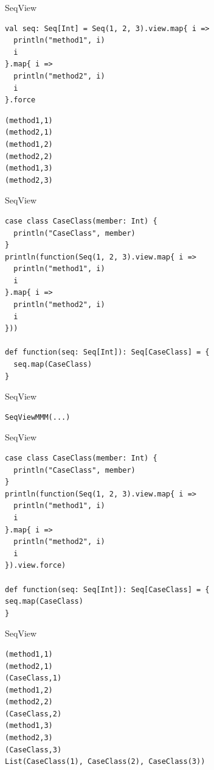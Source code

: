 \documentclass[xcolor=svgnames]{beamer}
\begin{document}
    \begin{frame}[fragile] %
    {SeqView}
        \begin{Verbatim}[formatcom=\sffamily]
val seq: Seq[Int] = Seq(1, 2, 3).view.map{ i =>
  println("method1", i)
  i
}.map{ i =>
  println("method2", i)
  i
}.force
        \end{Verbatim}

        \noindent\makebox[\linewidth]{\rule{\paperwidth}{0.4pt}}

        \pause

        \begin{Verbatim}[formatcom=\sffamily]
(method1,1)
(method2,1)
(method1,2)
(method2,2)
(method1,3)
(method2,3)
        \end{Verbatim}
    \end{frame}

    \begin{frame}[fragile] %
    {SeqView}
        \begin{Verbatim}[formatcom=\sffamily]
case class CaseClass(member: Int) {
  println("CaseClass", member)
}
println(function(Seq(1, 2, 3).view.map{ i =>
  println("method1", i)
  i
}.map{ i =>
  println("method2", i)
  i
}))

def function(seq: Seq[Int]): Seq[CaseClass] = {
  seq.map(CaseClass)
}
        \end{Verbatim}
    \end{frame}

    \begin{frame}[fragile] %
    {SeqView}
        \begin{Verbatim}[formatcom=\sffamily]
SeqViewMMM(...)
        \end{Verbatim}
    \end{frame}

    \begin{frame}[fragile] %
    {SeqView}
        \begin{Verbatim}[formatcom=\sffamily]
case class CaseClass(member: Int) {
  println("CaseClass", member)
}
println(function(Seq(1, 2, 3).view.map{ i =>
  println("method1", i)
  i
}.map{ i =>
  println("method2", i)
  i
}).view.force)

def function(seq: Seq[Int]): Seq[CaseClass] = {
seq.map(CaseClass)
}
        \end{Verbatim}
    \end{frame}

    \begin{frame}[fragile] %
    {SeqView}
        \begin{Verbatim}[formatcom=\sffamily]
(method1,1)
(method2,1)
(CaseClass,1)
(method1,2)
(method2,2)
(CaseClass,2)
(method1,3)
(method2,3)
(CaseClass,3)
List(CaseClass(1), CaseClass(2), CaseClass(3))
        \end{Verbatim}
    \end{frame}
\end{document}
